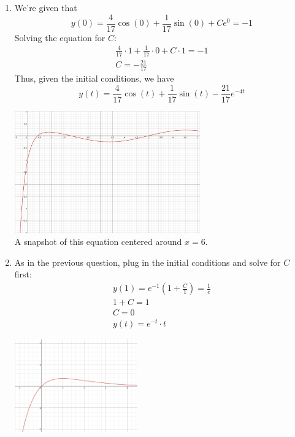 \documentclass[12pt]{article}
\begin{document}
\begin{enumerate}
    \item We're given that \[y(0)=\frac{4}{17}\cos(0)+\frac{1}{17}\sin(0)+Ce^{0}=-1\]
          Solving the equation for $C$: \begin{gather*}
              \frac{4}{17} \cdot 1 +\frac{1}{17} \cdot 0+C \cdot 1=-1 \\
              C=-\frac{21}{17}
          \end{gather*}
          Thus, given the initial conditions, we have \[\boxed{y(t)=\frac{4}{17}\cos(t)+\frac{1}{17}\sin(t)-\frac{21}{17}e^{-4t}}\]
          \begin{center}
              \includegraphics[width=8cm]{img/graph1} \\
              \small{A snapshot of this equation centered around $x=6$.}
          \end{center}
    \item As in the previous question, plug in the initial conditions and solve for $C$ first:
          \begin{gather*}
              y(1)=e^{-1}(1+\frac{C}{1})=\frac{1}{e} \\
              1+C=1 \\
              C=0 \\
              \boxed{y(t)=e^{-t} \cdot t}
          \end{gather*}
          \begin{center}
              \includegraphics[height=4cm]{img/graph2} \\
          \end{center}


\end{enumerate}
\end{document}
